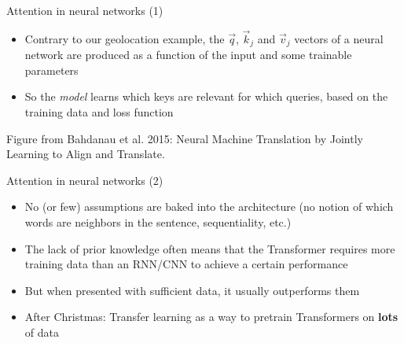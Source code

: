 \begin{vbframe}{Attention in neural networks (1)}

\vskip-2mm
\vfill

\begin{itemize}
\item Contrary to our geolocation example, the $\vec q$, $\vec k_j$ and $\vec v_j$ vectors of a neural network are produced as a function of the input and some trainable parameters
\item So the \textit{model} learns which keys are relevant for which queries, based on the training data and loss function
\end{itemize}
\begin{center}
\end{center}
{\scriptsize Figure from Bahdanau et al. 2015: Neural Machine Translation by Jointly Learning to Align and Translate.}

\vfill

\end{vbframe}


\begin{vbframe}{Attention in neural networks (2)}

\vfill

\begin{itemize}
	\item No (or few) assumptions are baked into the architecture (no notion of which words are neighbors in the sentence, sequentiality, etc.)
	\item The lack of prior knowledge often means that the Transformer requires more training data than an RNN/CNN to achieve a certain performance
	\item But when presented with sufficient data, it usually outperforms them
	\item After Christmas: Transfer learning as a way to pretrain Transformers on \textbf{lots} of data
\end{itemize}

\vfill

\end{vbframe}

